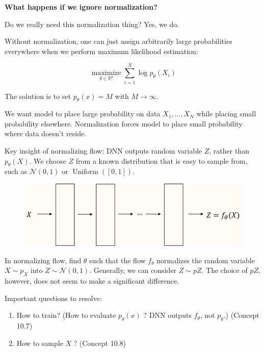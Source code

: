 \documentclass{report}
\begin{document}
\begin{concept}
    \textbf{What happens if we ignore normalization?}

    Do we really need this normalization thing? Yes, we do.

    Without normalization, one can just assign arbitrarily large probabilities everywhere when we perform maximum likelihood estimation:

    $$
    \underset{\theta \in \mathbb{R}^{p}}{\operatorname{maximize}} \sum_{i=1}^{N} \log p_{\theta}\left(X_{i}\right)
    $$

    The solution is to set $p_{\theta}(x)=M$ with $M \rightarrow \infty$.

    We want model to place large probability on data $X_{1}, \ldots, X_{N}$ while placing small probability elsewhere. Normalization forces model to place small probability where data doesn't reside.
\end{concept}

\par\noindent\textcolor{gray}{\hdashrule{\textwidth}{0.4pt}{1pt 2pt}}

\begin{definition}
    Key insight of normalizing flow: DNN outputs random variable $Z$, rather than $p_{\theta}(X)$.
    We choose \( Z \) from a known distribution that is easy to sample from, such as \( \mathcal{N}(0,1) \) or \( \operatorname{Uniform}([0,1]) \).

    \begin{figure}[H]
        \centering
        \includegraphics[width=1.0\textwidth]{.././assets/10.6.png}
    \end{figure}

    In normalizing flow, find $\theta$ such that the flow $f_{\theta}$ normalizes the random variable $X \sim p_{X}$ into $Z \sim \mathcal{N}(0,1)$.
    Generally, we can consider $Z \sim pZ$. The choice of $pZ$, however, does not seem to make a significant difference.

    Important questions to resolve:

    \begin{enumerate}
        \item How to train? (How to evaluate $p_{\theta}(x)$ ? DNN outputs $f_{\theta}$, not $p_{\theta}$.) (Concept 10.7)
        \item How to sample $X$ ? (Concept 10.8)
    \end{enumerate}
\end{definition}
\end{document}
